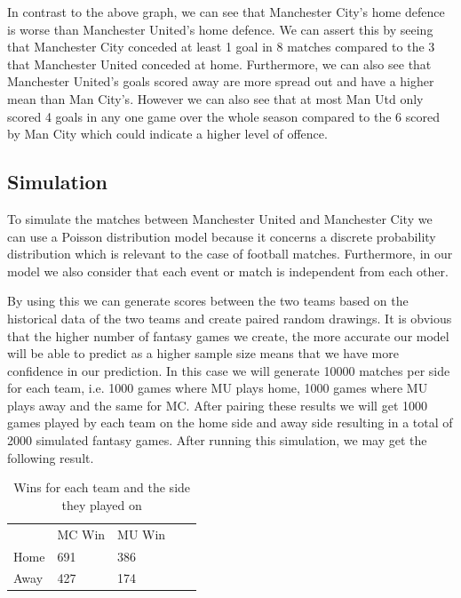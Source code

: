 \documentclass[12pt]{report}
\begin{document}
In contrast to the above graph, we can see that Manchester City's home defence is worse than Manchester United's home defence. We can assert this by seeing that Manchester City conceded at least 1 goal in 8 matches compared to the 3 that Manchester United conceded at home. Furthermore, we can also see that Manchester United's goals scored away are more spread out and have a higher mean than Man City's. However we can also see that at most Man Utd only scored 4 goals in any one game over the whole season compared to the 6 scored by Man City which could indicate a higher level of offence. 

\subsection{Simulation}
\vspace{0.3cm}

To simulate the matches between Manchester United and Manchester City we can use a Poisson distribution model because it concerns a discrete probability distribution which is relevant to the case of football matches. Furthermore, in our model we also consider that each event or match is independent from each other.

\vspace{0.3cm}
\noindent
By using this we can generate scores between the two teams based on the historical data of the two teams and create paired random drawings. It is obvious that the higher number of fantasy games we create, the more accurate our model will be able to predict as a higher sample size means that we have more confidence in our prediction. In this case we will generate 10000 matches per side for each team, i.e. 1000 games where MU plays home, 1000 games where MU plays away and the same for MC. After pairing these results we will get 1000 games played by each team on the home side and away side resulting in a total of 2000 simulated fantasy games. After running this simulation, we may get the following result.

\newpage
\begin{table}[ht]
\centering
\caption{Wins for each team and the side they played on}
\begin{tabular}{lllll}
         & MC Win & MU Win &  &  \\
Home  & 691 & 386 &  &  \\
Away & 427 & 174 &  &  \\
\end{tabular}
\end{table}
\end{document}
